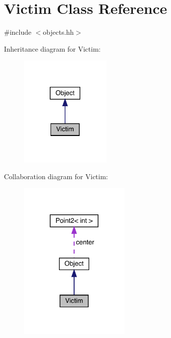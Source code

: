 \hypertarget{class_victim}{}\section{Victim Class Reference}
\label{class_victim}


{\ttfamily \#include $<$objects.\+hh$>$}



Inheritance diagram for Victim\+:
\nopagebreak
\begin{figure}[H]
\begin{center}
\leavevmode
\includegraphics[width=125pt]{class_victim__inherit__graph}
\end{center}
\end{figure}


Collaboration diagram for Victim\+:
\nopagebreak
\begin{figure}[H]
\begin{center}
\leavevmode
\includegraphics[width=152pt]{class_victim__coll__graph}
\end{center}
\end{figure}
